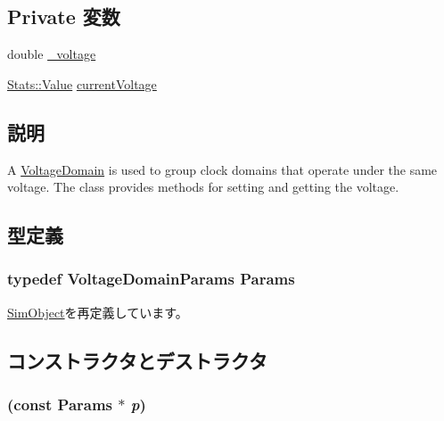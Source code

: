\subsection*{Private 変数}
\begin{DoxyCompactItemize}
\item 
double \hyperlink{classVoltageDomain_aaf1af884796c01ac02f71c1b244decba}{\_\-voltage}
\item 
\hyperlink{classStats_1_1Value}{Stats::Value} \hyperlink{classVoltageDomain_abc6914945babebfaf2e020db90006e28}{currentVoltage}
\end{DoxyCompactItemize}


\subsection{説明}
A \hyperlink{classVoltageDomain}{VoltageDomain} is used to group clock domains that operate under the same voltage. The class provides methods for setting and getting the voltage. 

\subsection{型定義}
\hypertarget{classVoltageDomain_a61186f371a672d43600e7a1741f9b3fa}{
\subsubsection[{Params}]{\setlength{\rightskip}{0pt plus 5cm}typedef VoltageDomainParams {\bf Params}}}
\label{classVoltageDomain_a61186f371a672d43600e7a1741f9b3fa}


\hyperlink{classSimObject_a0f0761d2db586a23bb2a2880b8f387bb}{SimObject}を再定義しています。

\subsection{コンストラクタとデストラクタ}
\hypertarget{classVoltageDomain_afb6675d6012adb00febeff48aef1882a}{
\subsubsection[{VoltageDomain}]{ (const {\bf Params} $\ast$ {\em p})}}
\label{classVoltageDomain_afb6675d6012adb00febeff48aef1882a}



